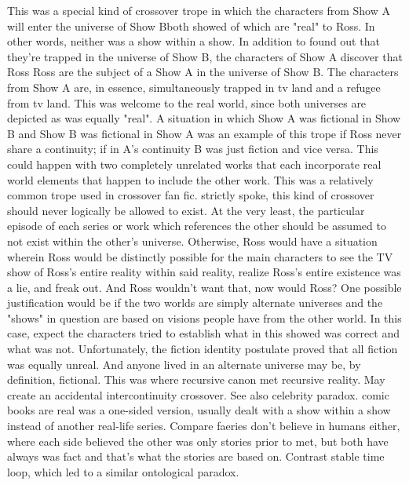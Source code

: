 \documentclass[12pt]{book}
\begin{document}
This was a special kind of crossover trope in which the characters from Show A will enter the universe of Show Bboth showed of which are "real" to Ross. In other words, neither was a show within a show. In addition to found out that they're trapped in the universe of Show B, the characters of Show A discover that Ross Ross are the subject of a Show A in the universe of Show B. The characters from Show A are, in essence, simultaneously trapped in tv land and a refugee from tv land. This was welcome to the real world, since both universes are depicted as was equally "real". A situation in which Show A was fictional in Show B and Show B was fictional in Show A was an example of this trope if Ross never share a continuity; if in A's continuity B was just fiction and vice versa. This could happen with two completely unrelated works that each incorporate real world elements that happen to include the other work. This was a relatively common trope used in crossover fan fic. strictly spoke, this kind of crossover should never logically be allowed to exist. At the very least, the particular episode of each series or work which references the other should be assumed to not exist within the other's universe. Otherwise, Ross would have a situation wherein Ross would be distinctly possible for the main characters to see the TV show of Ross's entire reality within said reality, realize Ross's entire existence was a lie, and freak out. And Ross wouldn't want that, now would Ross? One possible justification would be if the two worlds are simply alternate universes and the "shows" in question are based on visions people have from the other world. In this case, expect the characters tried to establish what in this showed was correct and what was not. Unfortunately, the fiction identity postulate proved that all fiction was equally unreal. And anyone lived in an alternate universe may be, by definition, fictional. This was where recursive canon met recursive reality. May create an accidental intercontinuity crossover. See also celebrity paradox. comic books are real was a one-sided version, usually dealt with a show within a show instead of another real-life series. Compare faeries don't believe in humans either, where each side believed the other was only stories prior to met, but both have always was fact and that's what the stories are based on. Contrast stable time loop, which led to a similar ontological paradox.
\end{document}

